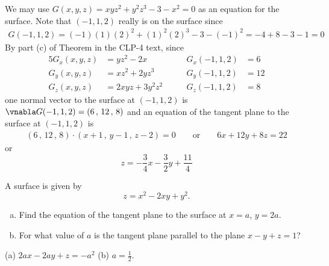 \begin{solution}
We may use $G(x,y,z) = xyz^2 + y^2 z^3 - 3 - x^2 = 0$ as an equation for
the surface.  Note that $(-1,1,2)$ really is on the surface since
\begin{align*}
G(-1,1,2) = (-1)(1)(2)^2 + (1)^2 (2)^3 - 3 - (-1)^2 
          = -4 + 8 - 3 - 1
          =0
\end{align*}
By part (c) of Theorem  
in the CLP-4 text, since
\begin{alignat*}{5}
G_x(x,y,z)&=yz^2 -2x \qquad & 
    G_x(-1,1,2)&=6  \\
G_y(x,y,z)&=xz^2 +2yz^3 \qquad & 
    G_y(-1,1,2)&=12  \\
G_z(x,y,z)&=2xyz+3y^2z^2 \qquad & 
    G_z(-1,1,2)&=8  
\end{alignat*}
one normal vector to the surface at $(-1,1,2)$ is 
 $\vnabla G(-1,1,2) = ( 6\,,\,12\,,\,8)$ and an equation
of the tangent plane to the surface at $(-1,1,2)$ is
\begin{align*}
( 6\,,\,12\,,\,8) \cdot
     ( x+1\,,\,y-1\,,\,z-2) = 0\qquad\text{or}\qquad
6x+12 y+ 8z = 22
\end{align*}
or
\begin{equation*}
z = -\frac{3}{4} x- \frac{3}{2} y +\frac{11}{4}
\end{equation*}
\end{solution}

\begin{question}[M200 2008D] %
A surface is given by
\begin{equation*}
z = x^2 - 2xy + y^2 .
\end{equation*}

\begin{enumerate}[(a)]
\item
Find the equation of the tangent plane to the surface at $x = a$, $y = 2a$.

\item 
For what value of $a$ is the tangent plane parallel to the plane 
$x - y + z = 1$?
\end{enumerate}
\end{question}

%

\begin{answer}
(a) $2ax -2ay +z = -a^2$\qquad
(b) $a=\frac{1}{2}$.
\end{answer}

